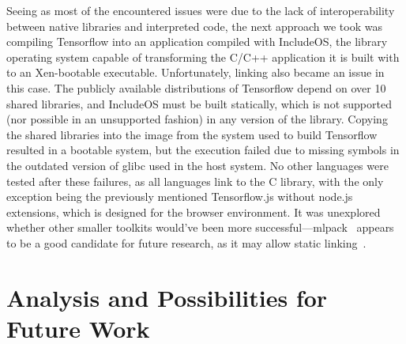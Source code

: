 \documentclass[conference]{IEEEtran}
\begin{document}
Seeing as most of the encountered issues were due to the lack of
interoperability between native libraries and interpreted code,
the next approach we took was compiling Tensorflow into an
application compiled with IncludeOS, the library operating system
capable of transforming the C/C++ application it is built with to
an Xen-bootable executable.  Unfortunately, linking also became
an issue in this case. The publicly available distributions of
Tensorflow depend on over 10 shared libraries, and IncludeOS must
be built statically, which is not supported (nor possible in an
unsupported fashion) in any version of the library. Copying the
shared libraries into the image from the system used to build
Tensorflow resulted in a bootable system, but the execution
failed due to missing symbols in the outdated version of glibc
used in the host system. No other languages were tested after
these failures, as all languages link to the C library, with the
only exception being the previously mentioned Tensorflow.js
without node.js extensions, which is designed for the browser
environment. It was unexplored whether other smaller toolkits
would’ve been more successful—mlpack~\cite{mlpack} appears to be
a good candidate for future research, as it may allow static
linking~\cite{mlpackcmake}.

\section{Analysis and Possibilities for Future Work}
\end{document}
